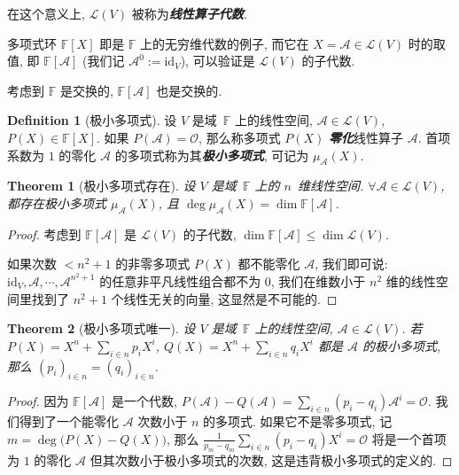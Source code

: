 \documentclass[openany]{ctexbook}
\newcommand*{\indexbf}[1]{\emph{\textbf{#1}}\index{#1}} %
\theoremstyle{plain}
\newtheorem{theorem}{Theorem}[section] %
\theoremstyle{definition}
\newtheorem{definition}{Definition}[section] %
\newcommand*{\id}{\mathrm{id}} %
\begin{document}
在这个意义上, $\mathcal L(V)$ 被称为\indexbf{线性算子代数}.

多项式环 $\mathbb F[X]$ 即是 $\mathbb F$ 上的无穷维代数的例子, 而它在 $X = \mathscr A \in \mathcal L(V)$ 时的取值, 即 $\mathbb F[\mathscr A]$ (我们记 $\mathscr A^0 := \id_V$), 可以验证是 $\mathcal L(V)$ 的子代数.

考虑到 $\mathbb F$ 是交换的, $\mathbb F[\mathscr A]$ 也是交换的. 

\begin{definition}[极小多项式]
	设 $V$ 是域~$\mathbb F$ 上的线性空间, $\mathscr A \in \mathcal L(V)$, $P(X) \in \mathbb F[X]$.
	如果 $P(\mathscr A) = \mathscr O$, 那么称多项式 $P(X)$ \indexbf{零化}线性算子 $\mathscr A$. 首项系数为 $1$ 的零化 $\mathscr A$ 的多项式称为其\indexbf{极小多项式}, 可记为 $\mu_{\mathscr A}(X)$.
\end{definition}

\begin{theorem}[极小多项式存在]
	设 $V$ 是域~$\mathbb F$ 上的 $n$~维线性空间. 
	$\forall \mathscr A \in \mathcal L(V)$, 都存在极小多项式 $\mu_\mathscr A (X)$, 且 $\deg \mu_{\mathscr A} (X) = \dim \mathbb F[\mathscr A]$.
\end{theorem}
\begin{proof}
	考虑到 $\mathbb F[\mathscr A]$ 是 $\mathcal L(V)$ 的子代数, $\dim \mathbb F[\mathscr A] \leq \dim \mathcal L(V)$. 

	如果次数 $< n^2 + 1$ 的非零多项式 $P(X)$ 都不能零化 $\mathscr A$, 我们即可说: 
	$\id_V, \mathscr A, \cdots, \mathscr A^{n^2 + 1}$ 的任意非平凡线性组合都不为 $0$, 我们在维数小于 $n^2$ 维的线性空间里找到了 $n^2 + 1$ 个线性无关的向量, 这显然是不可能的.
\end{proof}

\begin{theorem}[极小多项式唯一]
	设 $V$ 是域~$\mathbb F$ 上的线性空间, $\mathscr A \in \mathcal L(V)$. 
	若 $P(X) = X^n + \sum_{i \in n} p_i X^i$, $Q(X) = X^n + \sum_{i \in n} q_i X^i$ 都是 $\mathscr A$ 的极小多项式, 那么 $(p_i)_{i \in n} = (q_i)_{i \in n}$.
\end{theorem}
\begin{proof}
	因为 $\mathbb F[\mathscr A]$ 是一个代数, $P(\mathscr A) - Q(\mathscr A) = \sum_{i \in n} (p_i - q_i) \mathscr A^i = \mathscr O$. 
	我们得到了一个能零化 $\mathscr A$ 次数小于 $n$ 的多项式. 
	如果它不是零多项式, 记 $m = \deg \big( P(X) - Q(X)\big)$, 那么 $\frac{1}{p_m - q_m} \sum_{i \in n} (p_i - q_i) X^i = \mathscr O$ 将是一个首项为 $1$ 的零化 $\mathscr A$ 但其次数小于极小多项式的次数, 这是违背极小多项式的定义的.
\end{proof}
\end{document}
